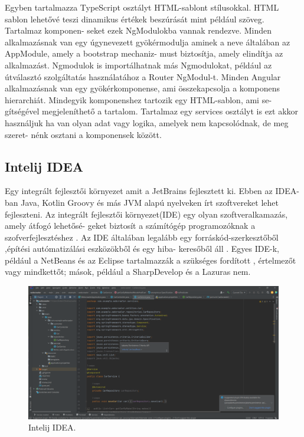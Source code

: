Egyben tartalmazza TypeScript osztályt HTML-sablont stílusokkal. HTML sablon lehetővé teszi dinamikus értékek beszúrását mint például szöveg. Tartalmaz komponen-
seket ezek NgModulokba vannak rendezve. Minden alkalmazásnak van egy úgynevezett gyökérmodulja aminek a neve általában az AppModule, amely a bootstrap mechaniz-
must biztosítja, amely elindítja az alkalmazást. Ngmodulok is importálhatnak más Ngmodulokat, például az útválasztó szolgáltatás használatához a Router NgModul-t.  Minden Angular alkalmazásnak van egy gyökérkomponense, ami összekapcsolja a komponens hierarchiát. Mindegyik komponenshez tartozik egy HTML-sablon, ami se-
gítségével megjeleníthető a tartalom. Tartalmaz egy services osztályt is ezt akkor használjuk ha van olyan adat vagy logika, amelyek nem kapcsolódnak, de meg szeret-
nénk osztani a komponensek között.\cite{Angular}


\subsection{Intelij IDEA}

Egy integrált fejlesztői környezet amit a JetBrains fejlesztett ki. Ebben az IDEA-ban Java, Kotlin Groovy és más JVM alapú nyelveken írt szoftvereket lehet fejleszteni. Az integrált fejlesztői környezet(IDE)  egy olyan  szoftveralkamazás, amely átfogó lehetősé-
geket biztosít a számítógép programozóknak a szofverfejlesztéshez . Az IDE általában legalább egy forráskód-szerkesztőből ,építési autómatizálási eszközökből és egy hiba-
keresőből áll . Egyes IDE-k, például a NetBeans és az Eclipse tartalmazzák a szükséges fordított , értelmezőt vagy mindkettőt; mások, például a SharpDevelop és a Lazuras nem.\cite{Intelij}\cite{Intelij2}
\newpage

\begin{figure}[h]
\centering
\includegraphics[scale=1]{images/Intelij.png}
\caption{Intelij IDEA.}
\label{fig:Intelij}
\end{figure}

